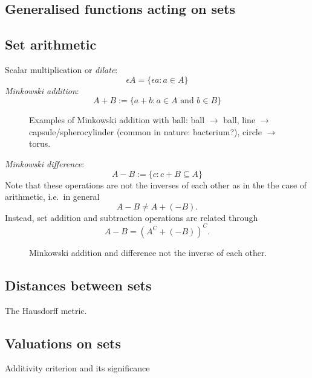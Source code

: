 \subsection{Generalised functions acting on sets}
\subsection{Set arithmetic}

Scalar multiplication or \emph{dilate}:
\begin{equation}
  \epsilon A = \{\epsilon a : a \in A\}
\end{equation}
\emph{Minkowski addition}:
\begin{equation}
  A + B := \{ a + b : a \in A \textrm{ and } b \in B \}
\end{equation}
\begin{SCfigure}[H]
  \missingfigure[figwidth=0.333\linewidth]{}%
  \missingfigure[figwidth=0.333\linewidth]{}%
  \missingfigure[figwidth=0.333\linewidth]{}
  \caption{Examples of Minkowski addition with ball:
    ball $\to$ ball,
    line $\to$ capsule/spherocylinder (common in nature: bacterium?),
    circle $\to$ torus.
  }
\end{SCfigure}
\emph{Minkowski difference}:
\begin{equation}
  A - B := \{ c : c + B \subseteq A \}
\end{equation}
Note that these operations are not the inverses of each other as in the the case of arithmetic, i.e.\ in general
\begin{equation*}
  A - B \ne A + (-B).
\end{equation*}
Instead, set addition and subtraction operations are related through
\begin{equation*}
  A - B = (A^C + (-B))^C.
\end{equation*}

\begin{SCfigure}[H]
  \caption{Minkowski addition and difference not the inverse of each other.}
\end{SCfigure}

\subsection{Distances between sets}
The Hausdorff metric.
\subsection{Valuations on sets}
Additivity criterion and its significance

